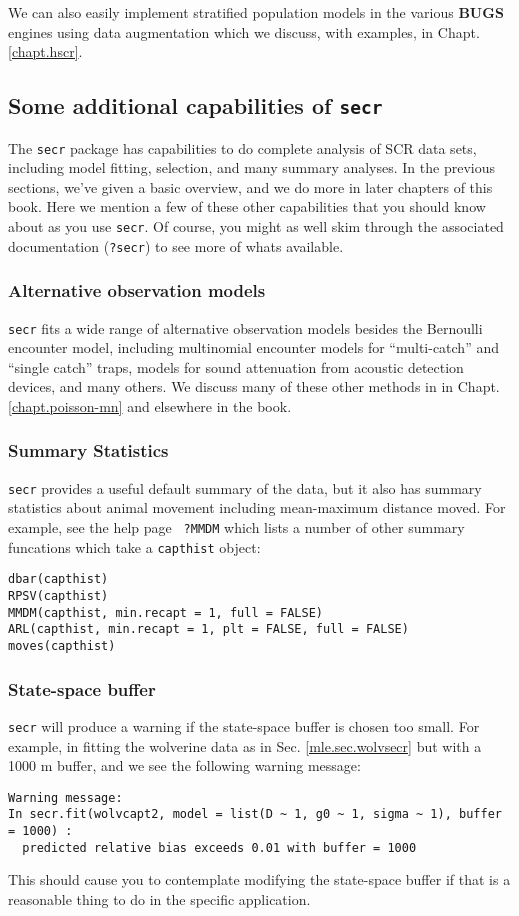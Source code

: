 We can also easily implement stratified population models in the
various {\bf BUGS} engines using data augmentation
\citep{converse_royle:2012,royle_converse:2013} which we discuss, with
examples,  in Chapt. \ref{chapt.hscr}.


\subsection{Some additional capabilities of \mbox{\tt secr}}

The \mbox{\tt secr} package has capabilities to do complete analysis
of SCR data sets, including model fitting, selection, and many summary
analyses. In the previous sections, we've given a basic overview, and
we do more in later chapters of this book.  Here we mention a few of
these other capabilities that you should know about as you use
\mbox{\tt secr}. Of course, you might as well skim through the
associated documentation (\mbox{\tt ?secr}) to see more of whats available.

\subsubsection{Alternative observation models}
\mbox{\tt secr} fits a wide range of alternative observation models
besides the Bernoulli encounter model, including multinomial encounter
models for ``multi-catch'' and ``single catch'' traps, models for
sound attenuation from acoustic detection devices, and many others. We
discuss many of these other methods in in
Chapt. \ref{chapt.poisson-mn} and elsewhere in the book.

\subsubsection{Summary Statistics} 
\mbox{\tt secr} provides a useful default summary of the data, but it
also has summary statistics about animal movement including
mean-maximum distance moved. For example, see the help page \mbox{\tt
  ?MMDM} which lists a number of other summary funcations which take a
\mbox{\tt capthist} object:
\begin{verbatim}
dbar(capthist)
RPSV(capthist)
MMDM(capthist, min.recapt = 1, full = FALSE)
ARL(capthist, min.recapt = 1, plt = FALSE, full = FALSE)
moves(capthist)
\end{verbatim}

\subsubsection{State-space buffer}
\mbox{\tt secr} 
will produce a warning if the state-space buffer is chosen too
small. For example, in fitting the wolverine data as in
Sec. \ref{mle.sec.wolvsecr} but with a 1000 m buffer, 
and we see the following warning message:
{\small
\begin{verbatim}
Warning message:
In secr.fit(wolvcapt2, model = list(D ~ 1, g0 ~ 1, sigma ~ 1), buffer = 1000) :
  predicted relative bias exceeds 0.01 with buffer = 1000
\end{verbatim}
}
This should cause you to contemplate modifying the state-space buffer
if that is a reasonable thing to do in the specific application.


